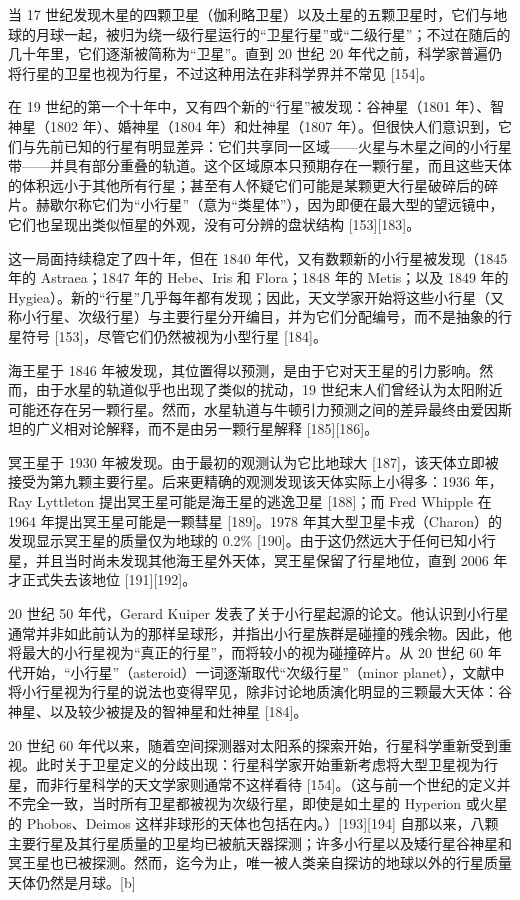 当 17 世纪发现木星的四颗卫星（伽利略卫星）以及土星的五颗卫星时，它们与地球的月球一起，被归为绕一级行星运行的“卫星行星”或“二级行星”；不过在随后的几十年里，它们逐渐被简称为“卫星”。直到 20 世纪 20 年代之前，科学家普遍仍将行星的卫星也视为行星，不过这种用法在非科学界并不常见 [154]。

在 19 世纪的第一个十年中，又有四个新的“行星”被发现：谷神星（1801 年）、智神星（1802 年）、婚神星（1804 年）和灶神星（1807 年）。但很快人们意识到，它们与先前已知的行星有明显差异：它们共享同一区域——火星与木星之间的小行星带——并具有部分重叠的轨道。这个区域原本只预期存在一颗行星，而且这些天体的体积远小于其他所有行星；甚至有人怀疑它们可能是某颗更大行星破碎后的碎片。赫歇尔称它们为“小行星”（意为“类星体”），因为即便在最大型的望远镜中，它们也呈现出类似恒星的外观，没有可分辨的盘状结构 [153][183]。

这一局面持续稳定了四十年，但在 1840 年代，又有数颗新的小行星被发现（1845 年的 Astraea；1847 年的 Hebe、Iris 和 Flora；1848 年的 Metis；以及 1849 年的 Hygiea）。新的“行星”几乎每年都有发现；因此，天文学家开始将这些小行星（又称小行星、次级行星）与主要行星分开编目，并为它们分配编号，而不是抽象的行星符号 [153]，尽管它们仍然被视为小型行星 [184]。

海王星于 1846 年被发现，其位置得以预测，是由于它对天王星的引力影响。然而，由于水星的轨道似乎也出现了类似的扰动，19 世纪末人们曾经认为太阳附近可能还存在另一颗行星。然而，水星轨道与牛顿引力预测之间的差异最终由爱因斯坦的广义相对论解释，而不是由另一颗行星解释 [185][186]。

冥王星于 1930 年被发现。由于最初的观测认为它比地球大 [187]，该天体立即被接受为第九颗主要行星。后来更精确的观测发现该天体实际上小得多：1936 年，Ray Lyttleton 提出冥王星可能是海王星的逃逸卫星 [188]；而 Fred Whipple 在 1964 年提出冥王星可能是一颗彗星 [189]。1978 年其大型卫星卡戎（Charon）的发现显示冥王星的质量仅为地球的 0.2\% [190]。由于这仍然远大于任何已知小行星，并且当时尚未发现其他海王星外天体，冥王星保留了行星地位，直到 2006 年才正式失去该地位 [191][192]。

20 世纪 50 年代，Gerard Kuiper 发表了关于小行星起源的论文。他认识到小行星通常并非如此前认为的那样呈球形，并指出小行星族群是碰撞的残余物。因此，他将最大的小行星视为“真正的行星”，而将较小的视为碰撞碎片。从 20 世纪 60 年代开始，“小行星”（asteroid）一词逐渐取代“次级行星”（minor planet），文献中将小行星视为行星的说法也变得罕见，除非讨论地质演化明显的三颗最大天体：谷神星、以及较少被提及的智神星和灶神星 [184]。

20 世纪 60 年代以来，随着空间探测器对太阳系的探索开始，行星科学重新受到重视。此时关于卫星定义的分歧出现：行星科学家开始重新考虑将大型卫星视为行星，而非行星科学的天文学家则通常不这样看待 [154]。（这与前一个世纪的定义并不完全一致，当时所有卫星都被视为次级行星，即使是如土星的 Hyperion 或火星的 Phobos、Deimos 这样非球形的天体也包括在内。）[193][194] 自那以来，八颗主要行星及其行星质量的卫星均已被航天器探测；许多小行星以及矮行星谷神星和冥王星也已被探测。然而，迄今为止，唯一被人类亲自探访的地球以外的行星质量天体仍然是月球。[b]

